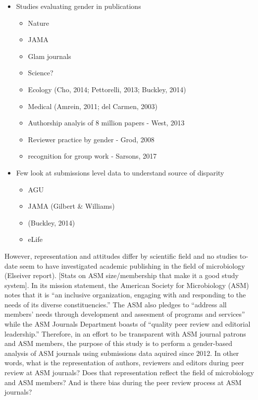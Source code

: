 \documentclass[11pt,]{article}
\providecommand{\tightlist}{%
  \setlength{\itemsep}{0pt}\setlength{\parskip}{0pt}}
\begin{document}
\begin{itemize}
\tightlist
\item
  Studies evaluating gender in publications

  \begin{itemize}
  \tightlist
  \item
    Nature
  \item
    JAMA
  \item
    Glam journals
  \item
    Science?
  \item
    Ecology (Cho, 2014; Pettorelli, 2013; Buckley, 2014)
  \item
    Medical (Amrein, 2011; del Carmen, 2003)
  \item
    Authorship analyis of 8 million papers - West, 2013
  \item
    Reviewer practice by gender - Grod, 2008
  \item
    recognition for group work - Sarsons, 2017
  \end{itemize}
\item
  Few look at submissions level data to understand source of disparity

  \begin{itemize}
  \tightlist
  \item
    AGU
  \item
    JAMA (Gilbert \& Williams)
  \item
    (Buckley, 2014)
  \item
    eLife
  \end{itemize}
\end{itemize}

However, representation and attitudes differ by scientific field and no
studies to-date seem to have investigated academic publishing in the
field of microbiology (Elseiver report). {[}Stats on ASM size/membership
that make it a good study system{]}. In its mission statement, the
American Society for Microbiology (ASM) notes that it is ``an inclusive
organization, engaging with and responding to the needs of its diverse
constituencies.'' The ASM also pledges to ``address all members' needs
through development and assesment of programs and services'' while the
ASM Journals Department boasts of ``quality peer review and editorial
leadership.'' Therefore, in an effort to be transparent with ASM journal
patrons and ASM members, the purpose of this study is to perform a
gender-based analysis of ASM journals using submissions data aquired
since 2012. In other words, what is the representation of authors,
reviewers and editors during peer review at ASM journals? Does that
representation reflect the field of microbiology and ASM members? And is
there bias during the peer review process at ASM journals?
\end{document}

